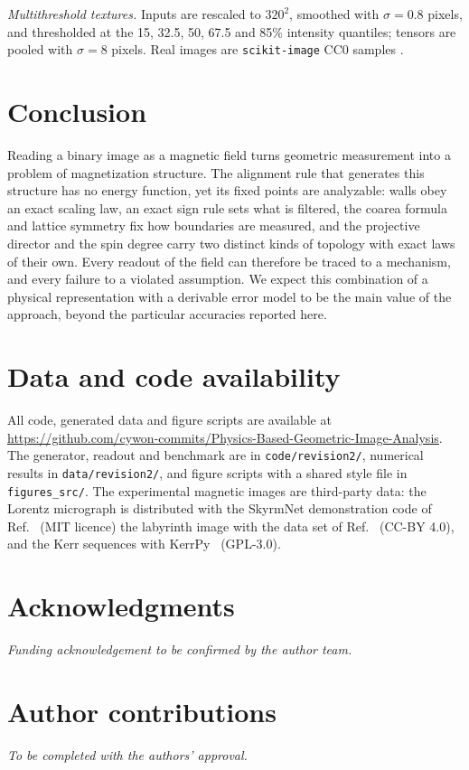 \documentclass[11pt,a4paper]{article}
\begin{document}
\emph{Multithreshold textures.} Inputs are rescaled to $320^2$, smoothed with $\sigma=0.8$ pixels, and thresholded at the 15, 32.5, 50, 67.5 and 85\% intensity quantiles; tensors are pooled with $\sigma=8$ pixels. Real images are \texttt{scikit-image} CC0 samples \cite{VanderWalt2014}.

\section{Conclusion}\label{sec:conclusion}
Reading a binary image as a magnetic field turns geometric measurement into a problem of magnetization structure. The alignment rule that generates this structure has no energy function, yet its fixed points are analyzable: walls obey an exact scaling law, an exact sign rule sets what is filtered, the coarea formula and lattice symmetry fix how boundaries are measured, and the projective director and the spin degree carry two distinct kinds of topology with exact laws of their own. Every readout of the field can therefore be traced to a mechanism, and every failure to a violated assumption. We expect this combination of a physical representation with a derivable error model to be the main value of the approach, beyond the particular accuracies reported here.

\section*{Data and code availability}
All code, generated data and figure scripts are available at \url{https://github.com/cywon-commits/Physics-Based-Geometric-Image-Analysis}. The generator, readout and benchmark are in \texttt{code/revision2/}, numerical results in \texttt{data/revision2/}, and figure scripts with a shared style file in \texttt{figures\_src/}. The experimental magnetic images are third-party data: the Lorentz micrograph is distributed with the SkyrmNet demonstration code of Ref.~\cite{McCray2024} (MIT licence) the labyrinth image with the data set of Ref.~\cite{Zhao2026} (CC-BY 4.0), and the Kerr sequences with KerrPy~\cite{KerrPy} (GPL-3.0).

\section*{Acknowledgments}
\emph{Funding acknowledgement to be confirmed by the author team.}

\section*{Author contributions}
\emph{To be completed with the authors' approval.}
\end{document}
